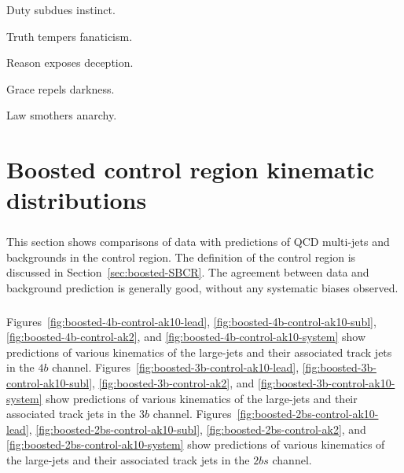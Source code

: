 \begin{savequote}[75mm]
Duty subdues instinct.   

Truth tempers fanaticism.   

Reason exposes deception.   

Grace repels darkness.   

Law smothers anarchy. 
\end{savequote}
\chapter{Boosted control region kinematic distributions}
\label{AppendixCR}

\paragraph{}
This section shows comparisons of data with predictions of QCD multi-jets and \ttbar~ backgrounds in the control region. 
The definition of the control region is discussed in Section~\ref{sec:boosted-SBCR}.
The agreement between data and background prediction is generally good, without any systematic biases observed.

\paragraph{}
Figures~\ref{fig:boosted-4b-control-ak10-lead}, \ref{fig:boosted-4b-control-ak10-subl}, \ref{fig:boosted-4b-control-ak2}, and \ref{fig:boosted-4b-control-ak10-system} show predictions of various kinematics of the large-\R jets and their associated track jets in the $4b$ channel. 
Figures~\ref{fig:boosted-3b-control-ak10-lead}, \ref{fig:boosted-3b-control-ak10-subl}, \ref{fig:boosted-3b-control-ak2},  and \ref{fig:boosted-3b-control-ak10-system} show predictions of various kinematics of the large-\R jets and their associated track jets in the $3b$ channel. 
Figures~\ref{fig:boosted-2bs-control-ak10-lead}, \ref{fig:boosted-2bs-control-ak10-subl}, \ref{fig:boosted-2bs-control-ak2},  and \ref{fig:boosted-2bs-control-ak10-system} show predictions of various kinematics of the large-\R jets and their associated track jets in the $2bs$ channel.

